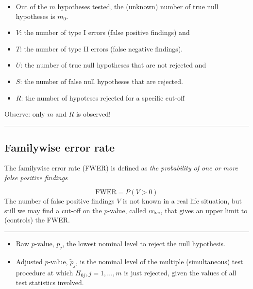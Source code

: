 \documentclass[
  letterpaper,
  DIV=11,
  numbers=noendperiod]{scrartcl}
\providecommand{\tightlist}{%
  \setlength{\itemsep}{0pt}\setlength{\parskip}{0pt}}\usepackage{longtable,booktabs,array}
\begin{document}
\begin{itemize}
\tightlist
\item
  Out of the \(m\) hypotheses tested, the (unknown) number of true null
  hypotheses is \(m_0\).
\item
  \(V\): the number of type I errors (false positive findings) and
\item
  \(T\): the number of type II errors (false negative findings).
\item
  \(U\): the number of true null hypotheses that are not rejected and
\item
  \(S\): the number of false null hypotheses that are rejected.
\item
  \(R\): the number of hypoteses rejected for a specific cut-off
\end{itemize}

Observe: only \(m\) and \(R\) is observed!

\begin{center}\rule{0.5\linewidth}{0.5pt}\end{center}

\hypertarget{familywise-error-rate}{%
\subsection{Familywise error rate}\label{familywise-error-rate}}

The familywise error rate (FWER) is defined as \emph{the probability of
one or more false positive findings}

\[ \text{FWER} = P(V > 0) \] The number of false positive findings \(V\)
is not known in a real life situation, but still we may find a cut-off
on the \(p\)-value, called \(\alpha_{\text loc}\), that gives an upper
limit to (controls) the FWER.

\begin{center}\rule{0.5\linewidth}{0.5pt}\end{center}

\begin{itemize}
\tightlist
\item
  Raw \(p\)-value, \(p_j\), the lowest nominal level to reject the null
  hypothesis.\\
\item
  Adjusted \(p\)-value, \(\tilde{p}_j\), is the nominal level of the
  multiple (simultaneous) test procedure at which
  \(H_{0j}, j=1,\ldots,m\) is just rejected, given the values of all
  test statistics involved.
\end{itemize}
\end{document}
